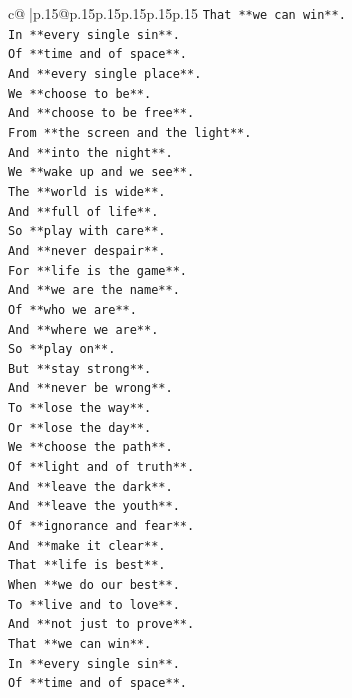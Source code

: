 \documentclass{article}
\begin{document}
{\begin{supertabular}{c@{$\;$}|p{.15\linewidth}@{}p{.15\linewidth}p{.15\linewidth}p{.15\linewidth}p{.15\linewidth}p{.15\linewidth}}
{{{\texttt{That **we can win**.} \\
\texttt{In **every single sin**.} \\
\texttt{Of **time and of space**.} \\
\texttt{And **every single place**.} \\
\texttt{We **choose to be**.} \\
\texttt{And **choose to be free**.} \\
\texttt{From **the screen and the light**.} \\
\texttt{And **into the night**.} \\
\texttt{We **wake up and we see**.} \\
\texttt{The **world is wide**.} \\
\texttt{And **full of life**.} \\
\texttt{So **play with care**.} \\
\texttt{And **never despair**.} \\
\texttt{For **life is the game**.} \\
\texttt{And **we are the name**.} \\
\texttt{Of **who we are**.} \\
\texttt{And **where we are**.} \\
\texttt{So **play on**.} \\
\texttt{But **stay strong**.} \\
\texttt{And **never be wrong**.} \\
\texttt{To **lose the way**.} \\
\texttt{Or **lose the day**.} \\
\texttt{We **choose the path**.} \\
\texttt{Of **light and of truth**.} \\
\texttt{And **leave the dark**.} \\
\texttt{And **leave the youth**.} \\
\texttt{Of **ignorance and fear**.} \\
\texttt{And **make it clear**.} \\
\texttt{That **life is best**.} \\
\texttt{When **we do our best**.} \\
\texttt{To **live and to love**.} \\
\texttt{And **not just to prove**.} \\
\texttt{That **we can win**.} \\
\texttt{In **every single sin**.} \\
\texttt{Of **time and of space**.} \\
}}}
\end{supertabular}}
\end{document}
